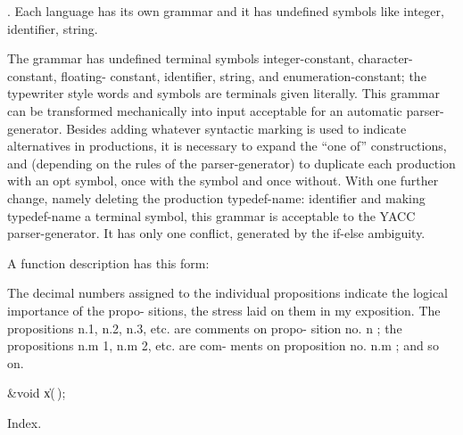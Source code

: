 

.
Each language has its own grammar and it has undefined symbols like integer,
identifier, string.

The grammar has undefined terminal symbols integer-constant,
character-constant, floating-
constant, identifier, string, and enumeration-constant; the typewriter style
words and
symbols are terminals given literally. This grammar can be transformed
mechanically into
input acceptable for an automatic parser-generator. Besides adding whatever
syntactic
marking is used to indicate alternatives in productions, it is necessary to
expand the ``one of''
constructions, and (depending on the rules of the parser-generator) to
duplicate each
production with an opt symbol, once with the symbol and once without. With one
further
change, namely deleting the production typedef-name: identifier and making
typedef-name a
terminal symbol, this grammar is acceptable to the YACC parser-generator. It
has only one
conflict, generated by the if-else ambiguity.

A function description has this form:

The decimal numbers assigned to the individual
propositions indicate the logical importance of the propo-
sitions, the stress laid on them in my exposition. The
propositions n.1, n.2, n.3, etc. are comments on propo-
sition no. n ; the propositions n.m 1, n.m 2, etc. are com-
ments on proposition no. n.m ; and so on.

\Y\B\&{void} \|x(\,);\par
\fi

Index.
\fi

\inx
\fin
\con
